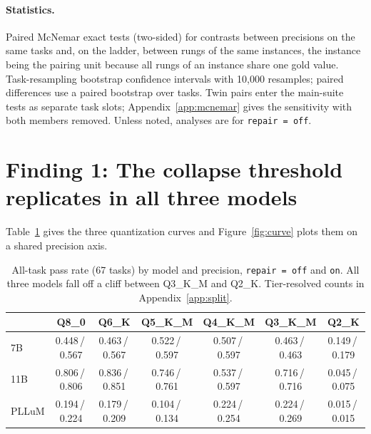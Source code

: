 \documentclass[11pt]{article}
\begin{document}
\paragraph{Statistics.} Paired McNemar exact tests (two-sided) for contrasts between precisions on the same tasks and, on the ladder, between rungs of the same instances, the instance being the pairing unit because all rungs of an instance share one gold value. Task-resampling bootstrap confidence intervals with 10{,}000 resamples; paired differences use a paired bootstrap over tasks. Twin pairs enter the main-suite tests as separate task slots; Appendix~\ref{app:mcnemar} gives the sensitivity with both members removed. Unless noted, analyses are for \texttt{repair\,=\,off}.

\section{Finding 1: The collapse threshold replicates in all three models}
\label{sec:f1}

Table~\ref{tab:curves} gives the three quantization curves and Figure~\ref{fig:curve} plots them on a shared precision axis.

\begin{table}[h]
\centering
\caption{All-task pass rate (67 tasks) by model and precision, \texttt{repair\,=\,off} and \texttt{on}. All three models fall off a cliff between Q3\_K\_M and Q2\_K. Tier-resolved counts in Appendix~\ref{app:split}.}
\label{tab:curves}
\begin{tabular}{lcccccc}
\toprule
& Q8\_0 & Q6\_K & Q5\_K\_M & Q4\_K\_M & Q3\_K\_M & Q2\_K \\
\midrule
7B    & 0.448\,/\,0.567 & 0.463\,/\,0.567 & 0.522\,/\,0.597 & 0.507\,/\,0.597 & 0.463\,/\,0.463 & 0.149\,/\,0.179 \\
11B   & 0.806\,/\,0.806 & 0.836\,/\,0.851 & 0.746\,/\,0.761 & 0.537\,/\,0.597 & 0.716\,/\,0.716 & 0.045\,/\,0.075 \\
PLLuM & 0.194\,/\,0.224 & 0.179\,/\,0.209 & 0.104\,/\,0.134 & 0.224\,/\,0.254 & 0.224\,/\,0.269 & 0.015\,/\,0.015 \\
\bottomrule
\end{tabular}
\end{table}
\end{document}
